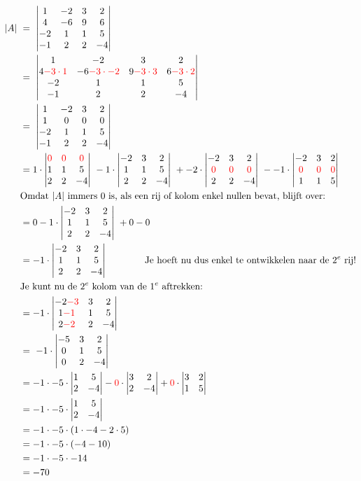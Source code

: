 	\begin{align*}
	|A|  \ & = \ \detvier{1 & -2 & 3 & 2 }
	{ 4 & -6 & 9 & 6  }
	{  -2 & 1 & 1 & 5 }
	{ -1 & 2 & 2 & -4 } \\
    \ & = \ \detvier{1 & -2 & 3 & 2 }
	{ 4\red{-3\cdot1} & -6\red{-3\cdot-2} & 9\red{-3\cdot3} & 6\red{-3\cdot2}  }
	{  -2 & 1 & 1 & 5 }
	{ -1 & 2 & 2 & -4 } \\
	  & = \ \detvier{1 & -2 & 3 & 2  }
	{ 1 & 0 &  0 & 0 }
	{  -2 & 1 & 1 & 5 }
	{ -1 & 2 & 2 & -4 } \\%
	& = 1\cdot \detdrie{ \red{0} & \red{0} & \red{0} }{1 & 1 & 5 }{ 2 & 2 & -4 }\ 
    -1\cdot  \detdrie{ -2 & 3 & 2 }{1 & 1 & 5 }{ 2 & 2 & -4 }\ %
    +-2\cdot \detdrie{ -2 & 3 & 2 }{\red{0} & \red{0} & \red{0} }{ 2 & 2 & -4 }\ 
    --1\cdot \detdrie{ -2 & 3 & 2 }{\red{0} & \red{0} & \red{0} }{ 1 & 1 & 5 } \\
    &\text{Omdat } |A| \text{ immers $0$ is, als een rij of kolom enkel nullen bevat, blijft over: } \\
    &= 0 -1\cdot  \detdrie{ -2 & 3 & 2 }{1 & 1 & 5 }{ 2 & 2 & -4 }\ + 0 - 0\\
    &= -1\cdot  \detdrie{ -2 & 3 & 2 }{1 & 1 & 5 }{ 2 & 2 & -4 }\qquad \qquad \text{Je hoeft nu dus enkel te ontwikkelen naar de } 2^e \text{ rij!}\\
    &\text{Je kunt nu de } 2^e \text{ kolom van de } 1^e \text{ aftrekken: } \\ 
    &= -1\cdot  \detdrie{ -2 \red{-3} & 3 & 2 }{1 \red{-1} & 1 & 5 }{ 2\red{-2} & 2 & -4 }\\
    &= \ -1\cdot \detdrie{ -5 & 3 & 2 }{0 & 1 & 5 }{ 0 & 2 & -4 }\ \\ 
    &= -1\cdot -5\cdot \dettwee{1&5}{2&-4} - \red{0}\cdot \dettwee{3&2}{2&-4} + \red{0}\cdot\dettwee{3&2}{1&5}\\
    &= -1\cdot -5\cdot \dettwee{1&5}{2&-4}\\
    &= -1\cdot -5\cdot (1\cdot -4 -2\cdot 5) \\
    &= -1\cdot -5\cdot (-4 -10) \\
    &= -1\cdot -5\cdot -14 \\
    &= -70 \\
	\end{align*}

